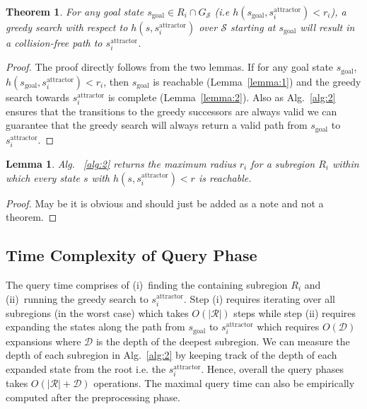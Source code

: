 \documentclass[letterpaper]{article} %
\newcommand{\calS}{\ensuremath{\mathcal{S}}\xspace}
\newcommand{\calR}{\ensuremath{\mathcal{R}}\xspace}
\newcommand{\calD}{\ensuremath{\mathcal{D}}\xspace}
\newcommand{\sAttract}{\ensuremath{s^{\text{attractor}}_i}\xspace}
\newcommand{\sGoal}{\ensuremath{s_{\text{goal}}\xspace}}
\newtheorem{theorem}{Theorem}
\newtheorem{lemma}{Lemma}
\begin{document}
\begin{theorem}
For any goal state $s_{\text{goal}} \in R_i \cap G_\calS$ (i.e $h(\sGoal,\sAttract) < r_i$), a greedy search with respect to $h(s, \sAttract)$ over $\calS$ starting at $\sGoal$ will result in a collision-free path to \sAttract. 
\end{theorem}

\begin{proof}
The proof directly follows from the two lemmas. If for any goal state $\sGoal$, $h(\sGoal,\sAttract) < r_i$, then $\sGoal$ is reachable (Lemma~\ref{lemma:1}) and the greedy search towards $\sAttract$ is complete (Lemma~\ref{lemma:2}). Also as Alg.~\ref{alg:2} ensures that the transitions to the greedy successors are always valid we can guarantee that the greedy search will always return a valid path from $\sGoal$ to $\sAttract$.
\end{proof}

\begin{lemma}
Alg. ~\ref{alg:2} returns the maximum radius $r_i$ for a subregion $R_i$ within which every state $s$ with $h(s,\sAttract) < r$ is reachable. 
\end{lemma}

\begin{proof}
{\color{blue} May be it is obvious and should just be added as a note and not a theorem.}
\end{proof} 

\subsection{Time Complexity of Query Phase}
The query time comprises of 
(i)~finding the containing subregion $R_i$ 
and
(ii)~running the greedy search to $\sAttract$.
Step (i) requires iterating over all subregions (in the worst case) which takes $O(|\calR|)$ steps while 
step (ii) requires expanding the states along the path from $\sGoal$ to $\sAttract$ which requires $O(\calD)$ expansions where $\calD$ is the depth of the deepest subregion. We can measure the depth of each subregion in Alg.~\ref{alg:2} by keeping track of the depth of each expanded state from the root i.e. the $\sAttract$. Hence, overall the query phases takes $O(|\calR| + \calD)$ operations. The maximal query time can also be empirically computed after the preprocessing phase.
\end{document}
